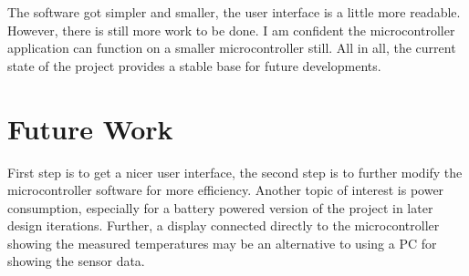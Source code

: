 \documentclass{article}[12pt]
\begin{document}
The software got simpler and smaller, the user interface is a little more readable. However, there is still more work to be done. I am confident the microcontroller application can function on a smaller microcontroller still. All in all, the current state of the project provides a stable base for future developments.

\section{Future Work}

First step is to get a nicer user interface, the second step is to further modify the microcontroller software for more efficiency. Another topic of interest is power consumption, especially for a battery powered version of the project in later design iterations. Further, a display connected directly to the microcontroller showing the measured temperatures may be an alternative to using a PC for showing the sensor data.
\end{document}
